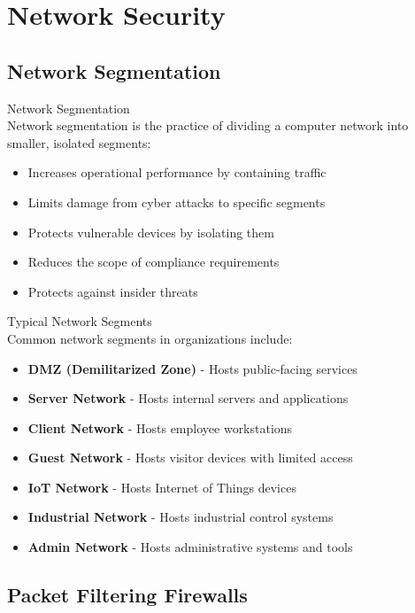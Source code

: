 \section{Network Security}

\subsection{Network Segmentation}

\begin{definition}{Network Segmentation}\\
Network segmentation is the practice of dividing a computer network into smaller, isolated segments:
\begin{itemize}
    \item Increases operational performance by containing traffic
    \item Limits damage from cyber attacks to specific segments
    \item Protects vulnerable devices by isolating them
    \item Reduces the scope of compliance requirements
    \item Protects against insider threats
\end{itemize}
\end{definition}

\begin{concept}{Typical Network Segments}\\
Common network segments in organizations include:
\begin{itemize}
    \item \textbf{DMZ (Demilitarized Zone)} - Hosts public-facing services
    \item \textbf{Server Network} - Hosts internal servers and applications
    \item \textbf{Client Network} - Hosts employee workstations
    \item \textbf{Guest Network} - Hosts visitor devices with limited access
    \item \textbf{IoT Network} - Hosts Internet of Things devices
    \item \textbf{Industrial Network} - Hosts industrial control systems
    \item \textbf{Admin Network} - Hosts administrative systems and tools
\end{itemize}
\end{concept}

\subsection{Packet Filtering Firewalls}

